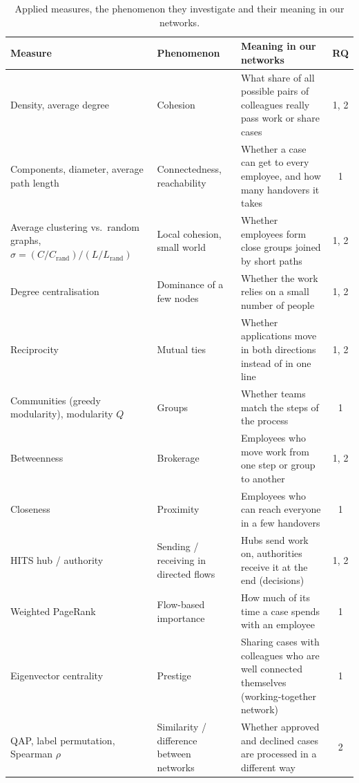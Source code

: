 \documentclass[12pt, a4paper]{article}
\begin{document}
\begin{table}[h]
\centering
\footnotesize
\setlength{\tabcolsep}{3pt}
\caption{Applied measures, the phenomenon they investigate and their meaning in our networks.}
\label{tab:measures}
\renewcommand{\arraystretch}{1.25}
\begin{tabularx}{\textwidth}{>{\raggedright\arraybackslash}p{}>{\raggedright\arraybackslash}p{}Yc}
\toprule
Measure & Phenomenon & Meaning in our networks & RQ \\
\midrule
Density, average degree & Cohesion & What share of all possible pairs of colleagues really pass work or share cases & 1, 2 \\
Components, diameter, average path length & Connectedness, reachability & Whether a case can get to every employee, and how many handovers it takes & 1 \\
Average clustering vs.\ random graphs, $\sigma = (C/C_{\text{rand}})/(L/L_{\text{rand}})$ & Local cohesion, small world & Whether employees form close groups joined by short paths & 1, 2 \\
Degree centralisation & Dominance of a few nodes & Whether the work relies on a small number of people & 1, 2 \\
Reciprocity & Mutual ties & Whether applications move in both directions instead of in one line & 1, 2 \\
Communities (greedy modularity), modularity $Q$ & Groups & Whether teams match the steps of the process & 1 \\
Betweenness & Brokerage & Employees who move work from one step or group to another & 1, 2 \\
Closeness & Proximity & Employees who can reach everyone in a few handovers & 1 \\
HITS hub / authority & Sending / receiving in directed flows & Hubs send work on, authorities receive it at the end (decisions) & 1, 2 \\
Weighted PageRank & Flow-based importance & How much of its time a case spends with an employee & 1 \\
Eigenvector centrality & Prestige & Sharing cases with colleagues who are well connected themselves (working-together network) & 1 \\
QAP, label permutation, Spearman $\rho$ & Similarity / difference between networks & Whether approved and declined cases are processed in a different way & 2 \\
\bottomrule
\end{tabularx}
\end{table}
\end{document}
